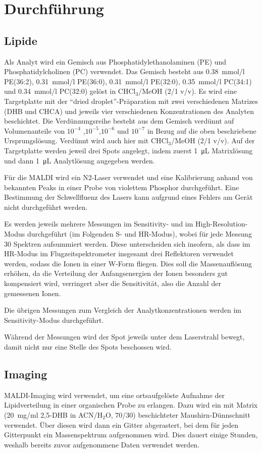 \section{Durchführung}

\subsection{Lipide}
Als Analyt wird ein Gemisch aus Phosphatidylethanolaminen (PE) und Phosphatidylcholinen (PC) verwendet.
Das Gemisch besteht aus \SI{0,38}{mmol/l} PE(36:2), \SI{0,31}{mmol/l} PE(36:0), \SI{0,31}{mmol/l} PE(32:0), \SI{0,35}{mmol/l} PC(34:1) und \SI{0,34}{mmol/l} PC(32:0) gelöst in CHCl$_3$/MeOH (2/1 v/v). %
Es wird eine Targetplatte mit der \enquote{dried droplet}-Präparation mit zwei verschiedenen Matrizes (DHB und CHCA) und jeweils vier verschiedenen Konzentrationen des Analyten beschichtet.
Die Verdünnungsreihe besteht aus dem Gemisch verdünnt auf Volumenanteile von $10^{-4}$ ,$10^{-5}$,$10^{-6}$ und $10^{-7}$ in Bezug auf die oben beschriebene Ursprungslösung.
Verdünnt wird auch hier mit CHCl$_3$/MeOH (2/1 v/v).
Auf der Targetplatte werden jeweil drei Spots angelegt, indem zuerst \SI{1}{\micro \liter} Matrixlösung und dann \SI{1}{\micro \liter} Analytlösung augegeben werden.

Für die MALDI wird ein N2-Laser verwendet und eine Kalibrierung anhand von bekannten Peaks in einer Probe von violettem Phosphor durchgeführt.
Eine Bestimmung der Schwellfluenz des Lasers kann aufgrund eines Fehlers am Gerät nicht durchgeführt werden.

Es werden jeweils mehrere Messungen im Sensitivity- und im High-Resolution-Modus durchgeführt (im Folgenden S- und HR-Modus), wobei für jede Messung 30 Spektren aufsummiert werden.
Diese unterscheiden sich insofern, als dass im HR-Modus im Flugzeitspektrometer insgesamt drei Reflektoren verwendet werden, sodass die Ionen in einer W-Form fliegen.
Dies soll die Massenauflösung erhöhen, da die Verteilung der Anfangsenergien der Ionen besonders gut kompensiert wird, verringert aber die Sensitivität, also die Anzahl der gemessenen Ionen.

Die übrigen Messungen zum Vergleich der Analytkonzentrationen werden im Sensitivity-Modus durchgeführt.

Während der Messungen wird der Spot jeweils unter dem Laserstrahl bewegt, damit nicht nur eine Stelle des Spots beschossen wird.

\subsection{Imaging}

MALDI-Imaging wird verwendet, um eine ortsaufgelöste Aufnahme der Lipidverteilung in einer organischen Probe zu erlangen.
Dazu wird ein mit Matrix (\SI{20}{mg/ml} 2,5-DHB in ACN/H$_2$O, 70/30) beschichteter Maushirn-Dünnschnitt verwendet.
Über diesen wird dann ein Gitter abgerastert, bei dem für jeden Gitterpunkt ein Massenspektrum aufgenommen wird.
Dies dauert einige Stunden, weshalb bereits zuvor aufgenommene Daten verwendet werden.
